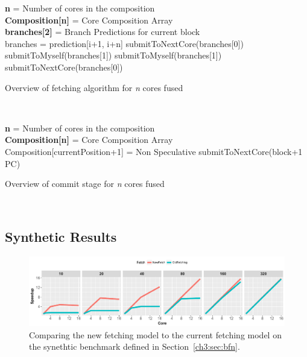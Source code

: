 \begin{algorithm}[t]

\textbf{n} = Number of cores in the composition\\
\textbf{Composition[n]} = Core Composition Array\\
\textbf{branches[2]} = Branch Predictions for current block\\

{
{
	branches = prediction[i+1, i+n]
}
{
	{
		submitToNextCore(branches[0])\\
		submitToMyself(branches[1])
	}
	{
		submitToMyself(branches[1])\\
	}
}
{
	{
		submitToNextCore(branches[0])\\
	}
}	
}
\caption{Overview of fetching algorithm for \textit{n} cores fused}~\label{alg:fetch}
\end{algorithm}

\begin{algorithm}[t]
\textbf{n} = Number of cores in the composition\\
\textbf{Composition[n]} = Core Composition Array\\

{
	{
		Composition[currentPosition+1] = Non Speculative\;
	}
	{
		submitToNextCore(block+1 PC)
	}
}

\caption{Overview of commit stage for \textit{n} cores fused}~\label{alg:commit}
\end{algorithm}

\subsection{Synthetic Results}

\begin{figure}[t]
    \centering
    \includegraphics[width=1\textwidth]{chapter3/graphics/new_vs_old_synthetic.pdf}
    \caption{Comparing the new fetching model to the current fetching model on the synethtic benchmark defined in Section~\ref{ch3:sec:bfn}.}
    \label{fig:synthetic_ex}
\end{figure}

